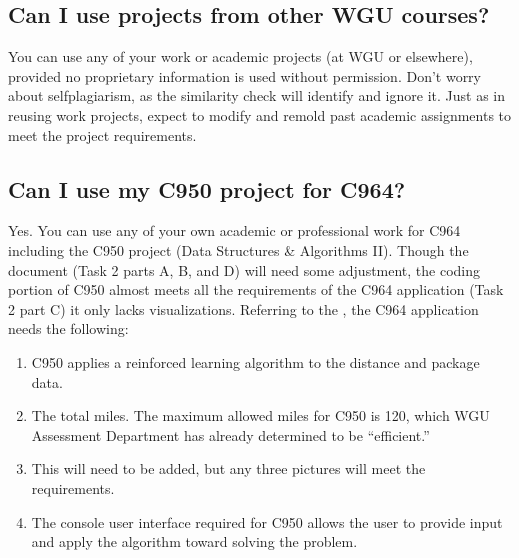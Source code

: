 \documentclass[letterpaper,10pt,english]{jupyterBook}
\begin{document}
\subsection{Can I use projects from other WGU courses?}
\label{\detokenize{task1:can-i-use-projects-from-other-wgu-courses}}
\sphinxAtStartPar
You can use any of your work or academic projects (at WGU or elsewhere), provided no proprietary information is used without permission. Don’t worry about self\sphinxhyphen{}plagiarism, as the similarity check will identify and ignore it. Just as in reusing work projects, expect to modify and remold past academic assignments to meet the project requirements.




\subsection{Can I use my C950 project for C964?}
\label{\detokenize{task1:can-i-use-my-c950-project-for-c964}}\label{\detokenize{task1:task1-faq-can-i-use-my-c950}}
\sphinxAtStartPar
Yes. You can use any of your own academic or professional work for C964 including the C950 project (Data Structures \& Algorithms II). Though the document (Task 2 parts A, B, and D) will need some adjustment, the coding portion of C950 almost meets all the requirements of the C964 application (Task 2 part C) \sphinxhyphen{}it only lacks visualizations. Referring to the , the C964 application needs the following:
\begin{enumerate}
%
\item {} 
\sphinxAtStartPar
{} C950 applies a reinforced learning algorithm to the distance and package data.

\item {} 
\sphinxAtStartPar
{} The total miles. The maximum allowed miles for C950 is 120, which WGU Assessment Department has already determined to be “efficient.”

\item {} 
\sphinxAtStartPar
{} This will need to be added, but any three pictures will meet the requirements.

\item {} 
\sphinxAtStartPar
{} The console user interface required for C950 allows the user to provide input and apply the algorithm toward solving the problem.

\end{enumerate}
\end{document}
